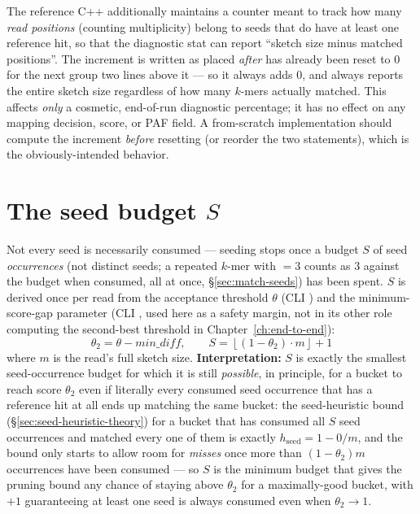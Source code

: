 \begin{bugbox}
\label{sec:defect-notmatched}
The reference C++ additionally maintains a  counter meant to track how many
\emph{read positions} (counting multiplicity) belong to seeds that do have at least one reference
hit, so that the diagnostic  stat can report ``sketch size minus
matched positions''. The increment is written as 
placed \emph{after}  has already been reset to $0$ for the next group two lines
above it --- so it always adds $0$, and  always reports the entire sketch
size regardless of how many $k$-mers actually matched. This affects \emph{only} a cosmetic,
end-of-run diagnostic percentage; it has no effect on any mapping decision, score, or PAF field.
A from-scratch implementation should compute the increment \emph{before} resetting 
(or reorder the two statements), which is the obviously-intended behavior.
\end{bugbox}

\section{The seed budget $S$}
\label{sec:seed-budget}

Not every seed is necessarily consumed --- seeding stops once a budget $S$ of seed
\emph{occurrences} (not distinct seeds; a repeated $k$-mer with $=3$ counts as
$3$ against the budget when consumed, all at once, \S\ref{sec:match-seeds}) has been spent. $S$ is
derived once per read from the acceptance threshold $\theta$ (CLI ) and the
minimum-score-gap parameter (CLI , used here as a safety margin, not in its other role
computing the second-best threshold in Chapter~\ref{ch:end-to-end}):
\[
  \theta_2 = \theta - \mathit{min\_diff}, \qquad
  S = \left\lfloor (1-\theta_2)\cdot m \right\rfloor + 1
\]
where $m$ is the read's full sketch size. \textbf{Interpretation:} $S$ is exactly the smallest
seed-occurrence budget for which it is still \emph{possible}, in principle, for a bucket to reach
score $\theta_2$ even if literally every consumed seed occurrence that has a reference hit at all
ends up matching the same bucket: the seed-heuristic bound (\S\ref{sec:seed-heuristic-theory})
for a bucket that has consumed all $S$ seed occurrences and matched every one of them is exactly
$h_{\mathrm{seed}} = 1 - 0/m$, and the bound only starts to allow room for \emph{misses} once more
than $(1-\theta_2)m$ occurrences have been consumed --- so $S$ is the minimum budget that gives the
pruning bound any chance of staying above $\theta_2$ for a maximally-good bucket, with $+1$
guaranteeing at least one seed is always consumed even when $\theta_2 \to 1$.

